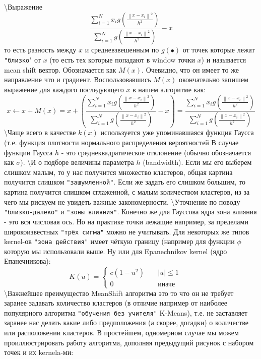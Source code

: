 \documentclass[11pt]{article}
\begin{document}
\textbackslash{}Выражение \[
\boxed{\frac{\sum\limits_{i = 1}^{N}x_i g\left(\frac{\left\|x - x_i\right\|^2}{h^2}\right)}{\sum\limits_{i = 1}^{N}g\left(\frac{\left\|x - x_i\right\|^2}{h^2}\right)} - x}
\] то есть разность между $x$ и средневзвешенным по $g(\bullet)$ от
точек которые лежат \verb'"близко'" от $x$ (то есть тех которые попадают
в window точки $x$) и называется mean shift вектор. Обозначается как
$M(x)$. Очевидно, что он имеет то же направление что и градиент.
Воспользовавшись $M(x)$ окончательно запишем выражение для каждого
последующего $x$ в нашем алгоритме как: \[
x \gets x + M(x) = x + \left(\frac{\sum\limits_{i = 1}^{N}x_i g\left(\frac{\left\|x - x_i\right\|^2}{h^2}\right)}{\sum\limits_{i = 1}^{N}g\left(\frac{\left\|x - x_i\right\|^2}{h^2}\right)} - x \right) = \frac{\sum\limits_{i = 1}^{N}x_i g\left(\frac{\left\|x - x_i\right\|^2}{h^2}\right)}{\sum\limits_{i = 1}^{N}g\left(\frac{\left\|x - x_i\right\|^2}{h^2}\right)}
\] \textbackslash{}Чаще всего в качестве $k(x)$ используется уже
упоминавшаяся функция Гаусса (т.е. функция плотности нормального
распределения вероятностей В случае функции Гаусса $h$ - это
среднеквадратическое отклонение (обычно обозначается как $\sigma$).
\textbackslash{}И о подборе величины параметра $h$ (bandwidth). Если мы
его выберем слишком малым, то у нас получится множество кластеров, общая
картина получится слишком \verb'"зашумленной"'. Если же задать его
слишком большим, то картина получится слишком сглаженной, с малым
количеством кластеров, из за чего мы рискуем не увидеть важные
закономерности. \textbackslash{}Уточнение по поводу
\verb'"близко-далеко"' и \verb'"зоны влияния"'. Конечно же для Гауссова
ядра зона влияния - это вся числовая ось. Но на практике точки лежащие
например, за пределами широкоизвестных \verb'"трёх сигма"' можно не
учитывать. Для некоторых же типов kernel-ов \verb'"зона действия"' имеет
чёткую границу (например для функции $\phi$ которую мы использовали
выше. Ну или для Epanechnikov kernel (ядро Епанечникова): \[
K\left( u \right) = \left\lbrace
            \begin{aligned}
            c\left( 1 - u^2 \right) && \; |u| \le 1 && \\
            0 && \; \mbox{иначе} &&
           \end{aligned}
          \right.
\] \textbackslash{}Важнейшее преимущество MeanShift алгоритма это то что
он не требует заранее задавать количество кластеров (в отличие например
от наиболее популярного алгоритма \verb'"обучения без учителя"'
K-Means), т.е. не заставляет заранее нас делать какие либо предположения
(а скорее, догадки) о количестве или расположении кластеров. В
простейшем, одномерном случае мы можем проиллюстрировать работу
алгоритма, дополняя предыдущий рисунок с набором точек и их kernela-ми:
\end{document}
